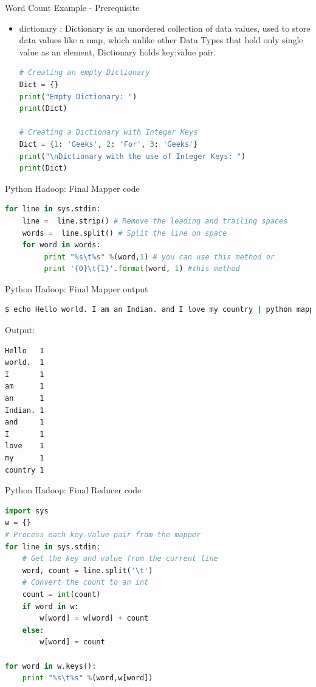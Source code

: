 \documentclass[pdf]{beamer}
\begin{document}
\begin{frame}[fragile]{Word Count Example - Prerequisite}
\begin{itemize}
	\item dictionary : Dictionary is an unordered collection of data values, used to store data values like a map, which unlike other Data Types that hold only single value as an element, Dictionary holds key:value pair. 
\begin{lstlisting}[language=python]
# Creating an empty Dictionary 
Dict = {} 
print("Empty Dictionary: ") 
print(Dict) 
  
# Creating a Dictionary with Integer Keys 
Dict = {1: 'Geeks', 2: 'For', 3: 'Geeks'} 
print("\nDictionary with the use of Integer Keys: ") 
print(Dict) 

\end{lstlisting}
\end{itemize}		
\end{frame}



\begin{frame}[fragile]{Python Hadoop: Final Mapper code}
\begin{lstlisting}[language=python]
for line in sys.stdin:
    line =  line.strip() # Remove the leading and trailing spaces
    words =  line.split() # Split the line on space
    for word in words:
         print "%s\t%s" %(word,1) # you can use this method or
         print '{0}\t{1}'.format(word, 1) #this method
\end{lstlisting}
\end{frame}

\begin{frame}[fragile]{Python Hadoop: Final Mapper output}
\begin{lstlisting}[language=bash]
$ echo Hello world. I am an Indian. and I love my country | python mapper.py 
\end{lstlisting}
Output:
\begin{lstlisting}[language=bash]
Hello   1
world.  1
I       1
am      1
an      1
Indian. 1
and     1
I       1
love    1
my      1
country 1
\end{lstlisting}
\end{frame}

\begin{frame}[fragile]{Python Hadoop: Final Reducer code}
\begin{lstlisting}[language=python]
import sys
w = {}
# Process each key-value pair from the mapper
for line in sys.stdin:
    # Get the key and value from the current line
    word, count = line.split('\t')
    # Convert the count to an int
    count = int(count)
    if word in w:
        w[word] = w[word] + count
    else:
        w[word] = count

for word in w.keys():
    print "%s\t%s" %(word,w[word])
\end{lstlisting}
\end{frame}
\end{document}
